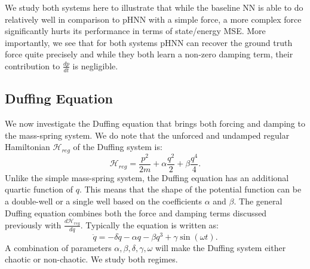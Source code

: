 \documentclass{article}
\begin{document}
We study both systems here to illustrate that while the baseline NN is able to do relatively well in comparison to pHNN with a simple force, a more complex force significantly hurts its performance in terms of state/energy MSE. More importantly, we see that for both systems pHNN can recover the ground truth force quite precisely and while they both learn a non-zero damping term, their contribution to $\frac{dp}{dt}$ is negligible. 

\subsection{Duffing Equation}

We now investigate the Duffing equation that brings both forcing and damping to the mass-spring system. We do note that the unforced and undamped regular Hamiltonian $\mathcal{H}_{reg}$ of the Duffing system is:
\begin{equation}
\mathcal{H}_{reg} = \frac{p^2}{2m}+ \alpha \frac{q^2}{2} + \beta \frac{q^4}{4}.
\end{equation}
Unlike the simple mass-spring system, the Duffing equation has an additional quartic function of $q$. This means that the shape of the potential function can be a double-well or a single well based on the coefficients $\alpha$ and $\beta$. The general Duffing equation combines both the force and damping terms discussed previously with $\frac{d\mathcal{H}_{reg}}{dq}$. Typically the equation is written as:
\begin{equation}
\ddot{q} = -\delta \dot{q} -\alpha q -\beta q^3 +\gamma \sin(\omega t). 
\end{equation}
A combination of parameters $\alpha,\beta,\delta,\gamma,\omega$ will make the Duffing system either chaotic or non-chaotic. We study both regimes.
\end{document}
